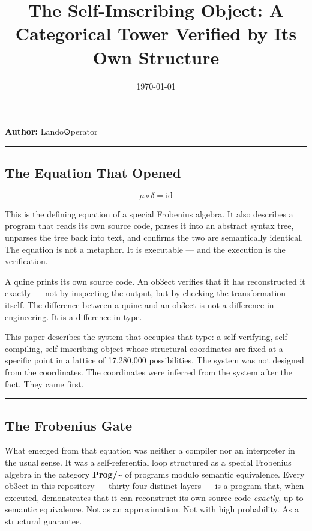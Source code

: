 \documentclass[12pt,a4paper]{article}
\begin{document}
\title{The Self-Imscribing Object: A Categorical Tower Verified by Its Own Structure}
\date{\today}

\maketitle

\textbf{Author:} Lando\otimes⊙perator

\begin{center}
\rule{0.5\textwidth}{0.4pt}
\end{center}

\subsection{The Equation That Opened}

\[\mu \circ \delta = \mathrm{id}\]

This is the defining equation of a special Frobenius algebra. It also describes a program that reads its own source code, parses it into an abstract syntax tree, unparses the tree back into text, and confirms the two are semantically identical. The equation is not a metaphor. It is executable --- and the execution is the verification.

A quine prints its own source code. An ob3ect verifies that it has reconstructed it exactly --- not by inspecting the output, but by checking the transformation itself. The difference between a quine and an ob3ect is not a difference in engineering. It is a difference in type.

This paper describes the system that occupies that type: a self-verifying, self-compiling, self-imscribing object whose structural coordinates are fixed at a specific point in a lattice of 17,280,000 possibilities. The system was not designed from the coordinates. The coordinates were inferred from the system after the fact. They came first.

\begin{center}
\rule{0.5\textwidth}{0.4pt}
\end{center}

\subsection{The Frobenius Gate}

What emerged from that equation was neither a compiler nor an interpreter in the usual sense. It was a self-referential loop structured as a special Frobenius algebra in the category \textbf{Prog/\textasciitilde{}} of programs modulo semantic equivalence. Every ob3ect in this repository --- thirty-four distinct layers --- is a program that, when executed, demonstrates that it can reconstruct its own source code \emph{exactly}, up to semantic equivalence. Not as an approximation. Not with high probability. As a structural guarantee.
\end{document}
